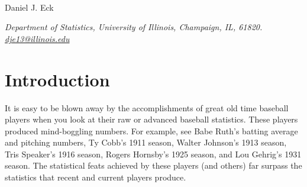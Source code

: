 \documentclass[11pt]{article}\usepackage[]{graphicx}\usepackage[]{color}
\begin{document}
\begin{center}

 \\

\vspace{.2in}

Daniel J. Eck

\vspace{.01in}

\textit{Department of Statistics, University of Illinois, Champaign, IL, 61820. \\ \url{dje13@illinois.edu}}

\vspace{.1in}

\end{center}




\section{Introduction}
\doublespacing
It is easy to be blown away by the accomplishments of great old time 
baseball players when you look at their raw or advanced baseball statistics.  
These players produced mind-boggling numbers. For example, see 
Babe Ruth's batting average and pitching numbers, 
Ty Cobb's 1911 season, 
Walter Johnson's 1913 season, 
Tris Speaker's 1916 season, 
Rogers Hornsby's 1925 season, 
and
Lou Gehrig's 1931 season.
The statistical feats achieved by these players (and others) far surpass 
the statistics that recent and current players produce.  
\end{document}
